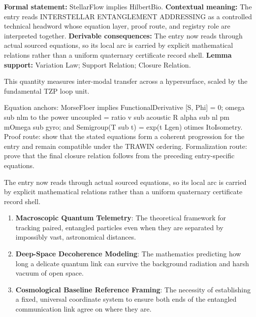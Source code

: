 \begingroup\footnotesize\setlength{\emergencystretch}{3em}\sloppy
\textbf{Formal statement:} StellarFlow implies HilbertBio. \textbf{Contextual meaning:} The entry reads INTERSTELLAR ENTANGLEMENT ADDRESSING as a controlled technical headword whose equation layer, proof route, and registry role are interpreted together. \textbf{Derivable consequences:} The entry now reads through actual sourced equations, so its local arc is carried by explicit mathematical relations rather than a uniform quaternary certificate record shell. \textbf{Lemma support:} Variation Law; Support Relation; Closure Relation.\par
\endgroup

This quantity measures inter-modal transfer across a hypersurface, scaled by the fundamental TZP loop unit.

Equation anchors: MorseFloer implies FunctionalDerivative [S, Phi] = 0; omega sub nlm to the power uncoupled = ratio v sub acoustic R alpha sub nl pm mOmega sub gyro; and Semigroup(T sub t) = exp(t Lgen) otimes ItoIsometry. Proof route: show that the stated equations form a coherent progression for the entry and remain compatible under the TRAWIN ordering. Formalization route: prove that the final closure relation follows from the preceding entry-specific equations.

The entry now reads through actual sourced equations, so its local arc is carried by explicit mathematical relations rather than a uniform quaternary certificate record shell.
\endgroup

\begin{enumerate}[leftmargin=1.6em,itemsep=6pt,topsep=4pt]
\item \textbf{Macroscopic Quantum Telemetry}: The theoretical framework for tracking paired, entangled particles even when they are separated by impossibly vast, astronomical distances.
\item \textbf{Deep-Space Decoherence Modeling}: The mathematics predicting how long a delicate quantum link can survive the background radiation and harsh vacuum of open space.
\item \textbf{Cosmological Baseline Reference Framing}: The necessity of establishing a fixed, universal coordinate system to ensure both ends of the entangled communication link agree on where they are.
\end{enumerate}

